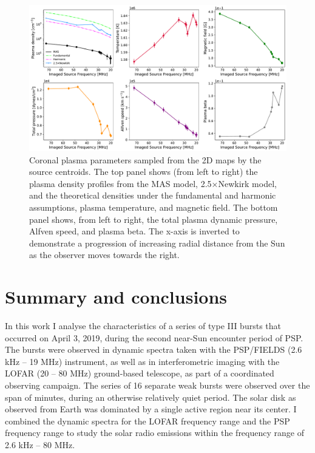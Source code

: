\begin{figure}[ht]
\centering
\includegraphics[width=\textwidth]{chapter3/figs/scatterplots_FORWARD_plasma_diagnostics_2019-04-01_4R.pdf}
\caption{Coronal plasma parameters sampled from the 2D maps by the source centroids. The top panel shows (from left to right) the plasma density profiles from the MAS model, 2.5×Newkirk model, and the theoretical densities under the fundamental and harmonic assumptions, plasma temperature, and magnetic field. The bottom panel shows, from left to right, the total plasma dynamic pressure, Alfven speed, and plasma beta. The x-axis is inverted to demonstrate a progression of increasing radial distance from the Sun as the observer moves towards the right.}
\label{scatterplot}
\end{figure}

\section{Summary and conclusions}
\label{sec_ch3_conclusions}
In this work I analyse the characteristics of a series of type III bursts that occurred on April 3, 2019, during the second near-Sun encounter period of PSP. The bursts were observed in dynamic spectra taken with the PSP/FIELDS (2.6 kHz – 19 MHz) instrument, as well as in interferometric imaging with the LOFAR (20 – 80 MHz) ground-based telescope, as part of a coordinated observing campaign. The series of 16 separate weak bursts were observed over the span of  minutes, during an otherwise relatively quiet period. The solar disk as observed from Earth was dominated by a single active region near its center. I combined the dynamic spectra for the LOFAR frequency range and the PSP frequency range to study the solar radio emissions within the frequency range of 2.6 kHz – 80 MHz. 

